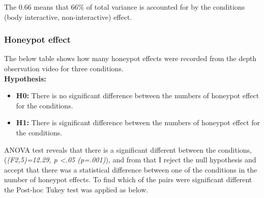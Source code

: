 The 0.66 means that 66\% of total variance is accounted for by the conditions (body interactive, non-interactive) effect.



\subsubsection {Honeypot effect}
The below table shows how many honeypot effects were recorded from the depth observation video for three conditions.\\

\textbf{Hypothesis: }
\begin{itemize}
\item \textbf{H0:} There is no significant difference between the numbers of honeypot effect for the conditions.
\item \textbf{H1:} There is significant difference between the numbers of honeypot effect for the conditions.
\end{itemize}


\begin{table}[H]
\caption{Number of Honeypot effect in three weeks}
\label{tab:landingeffectthreeweeks}
\centering
{}
\end{table}


ANOVA test reveals that there is a significant different between the conditions,(\emph{(F2,5)=12.29, p <.05 (p=.001)}), and from that I reject the null hypothesis and accept that there was a statistical difference between one of the conditions in the number of honeypot effects. To find which of the pairs were significant different the Post-hoc Tukey test was applied as below. 

\begin{table}[H]
\caption{Post-Hoc Tukey’s HSD results}
\label{tab:honeypot-non-posthoctukey}
\centering
{}
\end{table}

